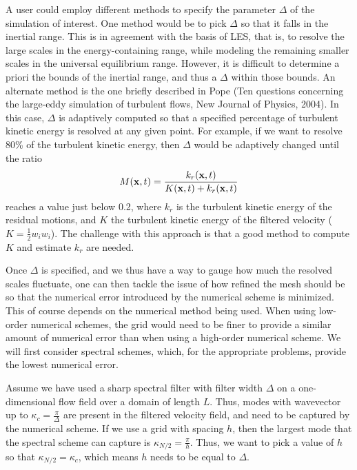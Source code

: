 \documentclass[oneside,a4paper,11pt]{report}
\begin{document}
A user could employ different methods to specify the parameter $\Delta$ of the simulation of interest. One method would be to pick $\Delta$ so that it falls in the inertial range. This is in agreement with the basis of LES, that is, to resolve the large scales in the energy-containing range, while modeling the remaining smaller scales in the universal equilibrium range. However, it is difficult to determine a priori the bounds of the inertial range, and thus a $\Delta$ within those bounds. An alternate method is the one briefly described in Pope (Ten questions concerning the large-eddy simulation of turbulent flows, New Journal of Physics, 2004). In this case, $\Delta$ is adaptively computed so that a specified percentage of turbulent kinetic energy is resolved at any given point. For example, if we want to resolve 80\% of the turbulent kinetic energy, then $\Delta$ would be adaptively changed until the ratio
\begin{equation}
M(\mathbf{x},t) = \frac{k_r(\mathbf{x},t)}{K(\mathbf{x},t) + k_r(\mathbf{x},t)}
\end{equation}
reaches a value just below 0.2, where $k_r$ is the turbulent kinetic energy of the residual motions, and $K$ the turbulent kinetic energy of the filtered velocity ($K = \frac{1}{2} w_i w_i$). The challenge with this approach is that a good method to compute $K$ and estimate $k_r$ are needed.

Once $\Delta$ is specified, and we thus have a way to gauge how much the resolved scales fluctuate, one can then tackle the issue of how refined the mesh should be so that the numerical error introduced by the numerical scheme is minimized. This of course depends on the numerical method being used. When using low-order numerical schemes, the grid would need to be finer to provide a similar amount of numerical error than when using a high-order numerical scheme. We will first consider spectral schemes, which, for the appropriate problems, provide the lowest numerical error. 

Assume we have used a sharp spectral filter with filter width $\Delta$ on a one-dimensional flow field over a domain of length $L$. Thus, modes with wavevector up to $\kappa_c = \frac{\pi}{\Delta}$ are present in the filtered velocity field, and need to be captured by the numerical scheme. If we use a grid with spacing $h$, then the largest mode that the spectral scheme can capture is $\kappa_{N/2} = \frac{\pi}{h}$. Thus, we want to pick a value of $h$ so that $\kappa_{N/2}=\kappa_c$, which means $h$ needs to be equal to $\Delta$.
\end{document}

